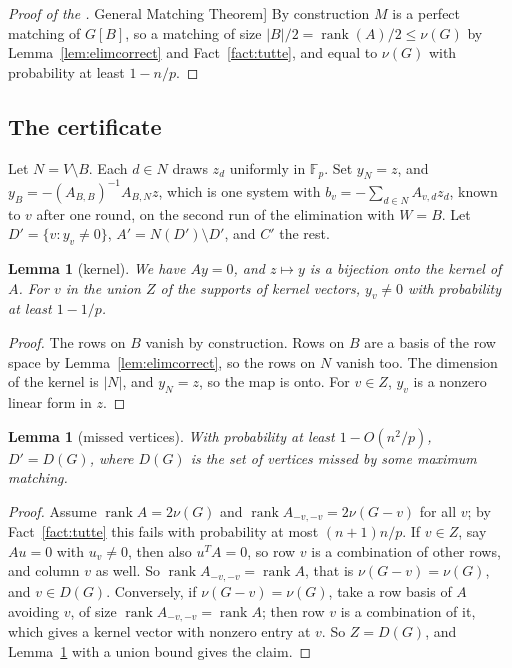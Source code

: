 \documentclass[11pt]{article}
\newtheorem{lemma}[theorem]{Lemma}
\theoremstyle{definition}
\theoremstyle{remark}
\theoremstyle{plain}
\newcommand{\ThmGen}{\hyperref[thm:gen]{General Matching Theorem}}
\newcommand{\rank}{\operatorname{rank}}
\newcommand{\F}{\mathbb{F}}
\begin{document}
\begin{proof}[Proof of the \ThmGen{}]
By construction $M$ is a perfect matching of $G[B]$, so a matching of size $|B|/2=\rank(A)/2\le\nu(G)$ by Lemma~\ref{lem:elimcorrect} and Fact~\ref{fact:tutte}, and equal to $\nu(G)$ with probability at
least $1-n/p$.
\end{proof}

\subsection{The certificate}\label{sec:cert}

Let $N=V\setminus B$. Each $d\in N$ draws $z_d$ uniformly in $\F_p$. Set $y_N=z$, and $y_B=-(A_{B,B})^{-1}A_{B,N}z$, which is one system with $b_v=-\sum_{d\in N}A_{v,d}z_d$, known to $v$ after one
round, on the second run of the elimination with $W=B$. Let $D'=\{v:y_v\ne0\}$, $A'=N(D')\setminus D'$, and $C'$ the rest.

\begin{lemma}[kernel]\label{lem:kernel}
We have $Ay=0$, and $z\mapsto y$ is a bijection onto the kernel of $A$. For $v$ in the union $Z$ of the supports of kernel vectors, $y_v\ne0$ with probability at least $1-1/p$.
\end{lemma}
\begin{proof}
The rows on $B$ vanish by construction. Rows on $B$ are a basis of the row space by Lemma~\ref{lem:elimcorrect}, so the rows on $N$ vanish too. The dimension of the kernel is $|N|$, and $y_N=z$, so the
map is onto. For $v\in Z$, $y_v$ is a nonzero linear form in $z$.
\end{proof}

\begin{lemma}[missed vertices]\label{lem:missed}
With probability at least $1-O(n^2/p)$, $D'=D(G)$, where $D(G)$ is the set of vertices missed by some maximum matching.
\end{lemma}
\begin{proof}
Assume $\rank A=2\nu(G)$ and $\rank A_{-v,-v}=2\nu(G-v)$ for all $v$; by Fact~\ref{fact:tutte} this fails with probability at most $(n+1)n/p$. If $v\in Z$, say $Au=0$ with $u_v\ne0$, then also $u^TA=0$, so
row $v$ is a combination of other rows, and column $v$ as well. So $\rank A_{-v,-v}=\rank A$, that is $\nu(G-v)=\nu(G)$, and $v\in D(G)$. Conversely, if $\nu(G-v)=\nu(G)$, take a row basis of $A$ avoiding $v$, of
size $\rank A_{-v,-v}=\rank A$; then row $v$ is a combination of it, which gives a kernel vector with nonzero entry at $v$. So $Z=D(G)$, and Lemma~\ref{lem:kernel} with a union bound gives the claim.
\end{proof}
\end{document}
